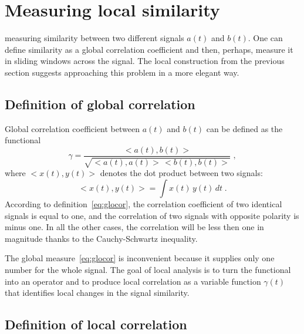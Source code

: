 \section{Measuring local similarity}

  measuring
similarity between two different signals $a(t)$ and $b(t)$. One can
define similarity as a global correlation coefficient and then,
perhaps, measure it in sliding windows across the signal. The local
construction from the previous section suggests approaching this
problem in a more elegant way.

\subsection{Definition of global correlation}

Global correlation coefficient between $a(t)$ and $b(t)$ can be
defined as the functional
\begin{equation}
  \label{eq:glocor}
  \gamma = \frac{<a(t),b(t)>}{\sqrt{<a(t),a(t)>\,<b(t),b(t)>}}\;,
\end{equation}
where $<x(t),y(t)>$ denotes the dot product between two signals:
\[
  <x(t),y(t)> = \int x(t)\,y(t)\,d t\;.
\]
According to  definition~\ref{eq:glocor}, the correlation
coefficient of two identical signals is equal to one, and the
correlation of two signals with opposite polarity is minus one. In all
the other cases, the correlation will be less then one in magnitude
thanks to the Cauchy-Schwartz inequality. 

The global measure~\ref{eq:glocor} is inconvenient because it
supplies only one number for the whole signal. The goal of local
analysis is to turn the functional into an operator and to produce
local correlation as a variable function $\gamma(t)$ that identifies
local changes in the signal similarity.

\subsection{Definition of local correlation}

